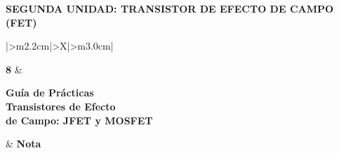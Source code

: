 \documentclass[11pt,a4paper]{article}
\let\needspace\Needspace
\begin{document}
\begin{center}
    {\normalsize\bfseries SEGUNDA UNIDAD: TRANSISTOR DE EFECTO DE CAMPO (FET)}
\end{center}

\vspace{0.55cm}

\begingroup
\renewcommand{\tabularxcolumn}[1]{m{#1}}
\renewcommand{\arraystretch}{2.0}
\setlength{\tabcolsep}{12pt}
\noindent
\begin{tabularx}{\textwidth}{|>{\centering\arraybackslash}m{2.2cm}|>{\centering\arraybackslash}X|>{\centering\arraybackslash}m{3.0cm}|}
\hline
\rule{0pt}{2.1cm}{\fontsize{58}{58}\selectfont\bfseries 8}
    & \begin{minipage}[c]{\linewidth}\centering
          {\large\bfseries Guía de Prácticas}\\[7pt]
          {\Large\bfseries Transistores de Efecto\\ de Campo: JFET y MOSFET}
      \end{minipage}
    & {\Large\bfseries Nota}\\
\hline
{}\\
\hline
{}\\
\\
\hline
\end{tabularx}
\endgroup

\vspace{0.8cm}

\newcommand{\paso}[2]{%
  \par\needspace{6\baselineskip}\vspace{8pt}\noindent
  \colorbox{black!8}{\makebox[\dimexpr\linewidth-2\fboxsep\relax][l]{%
    \textbf{Paso #1 \,·\, #2}}}\par\vspace{4pt}}

\end{document}

